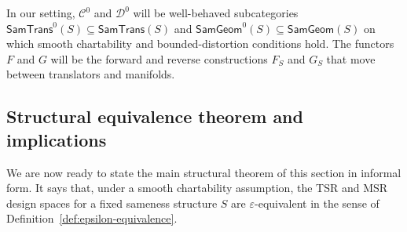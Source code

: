 \documentclass[11pt]{article}
\newcommand{\SamTrans}{\mathsf{SamTrans}}
\newcommand{\SamGeom}{\mathsf{SamGeom}}
\begin{document}
In our setting, $\mathcal{C}^0$ and $\mathcal{D}^0$ will be well-behaved subcategories
$\SamTrans^0(S) \subseteq \SamTrans(S)$ and $\SamGeom^0(S) \subseteq \SamGeom(S)$ on which
smooth chartability and bounded-distortion conditions hold. The functors $F$ and $G$ will be the
forward and reverse constructions $F_S$ and $G_S$ that move between translators and manifolds.

\subsection{Structural equivalence theorem and implications}
\label{subsec:structural-theorem}

We are now ready to state the main structural theorem of this section in informal form. It says
that, under a smooth chartability assumption, the TSR and MSR design spaces for a fixed sameness
structure $S$ are $\varepsilon$-equivalent in the sense of Definition~\ref{def:epsilon-equivalence}.
\end{document}
